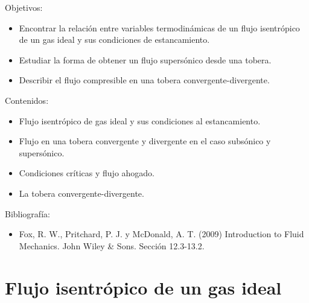 \begin{framed}

Objetivos:
\begin{itemize}
    \item Encontrar la relación entre variables termodinámicas de un flujo isentrópico de un gas ideal y sus condiciones de estancamiento.
    \item Estudiar la forma de obtener un flujo supersónico desde una tobera.
    \item Describir el flujo compresible en una tobera convergente-divergente.
\end{itemize}

Contenidos:
\begin{itemize}
    \item Flujo isentrópico de gas ideal y sus condiciones al estancamiento. 
    \item Flujo en una tobera convergente y divergente en el caso subsónico y supersónico. 
    \item Condiciones críticas y flujo ahogado.
    \item La tobera convergente-divergente.
\end{itemize}

Bibliografía:
\begin{itemize}
    \item Fox, R. W., Pritchard, P. J. y McDonald, A. T. (2009) Introduction to Fluid Mechanics. John Wiley \& Sons. Sección 12.3-13.2.
\end{itemize}
\end{framed}

\section*{Flujo isentrópico de un gas ideal}

